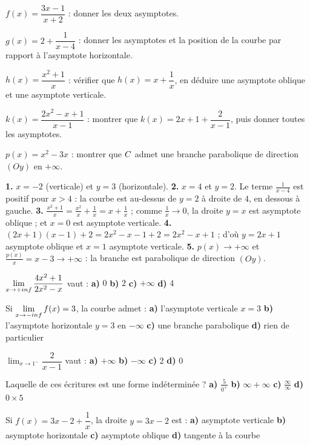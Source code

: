 \begin{entrainement}[asymptotes]
\exo[\niveau{1}] $f(x) = \dfrac{3x-1}{x+2}$ : donner les deux asymptotes.

\exo[\niveau{2}] $g(x) = 2+\dfrac{1}{x-4}$ : donner les asymptotes et la
position de la courbe par rapport à l'asymptote horizontale.

\exo[\niveau{2}] $h(x) = \dfrac{x^{2}+1}{x}$ : vérifier que
$h(x) = x+\dfrac1x$, en déduire une asymptote oblique et une asymptote
verticale.

\exo[\niveau{3}] $k(x) = \dfrac{2x^{2}-x+1}{x-1}$ : montrer que
$k(x) = 2x+1+\dfrac{2}{x-1}$, puis donner toutes les asymptotes.

\exo[\niveau{3}] $p(x) = x^{2}-3x$ : montrer que $C$ admet une branche
parabolique de direction $(Oy)$ en $+\infty$.
\end{entrainement}

\begin{corrige}[asymptotes]
\textbf{1.} $x = -2$ (verticale) et $y = 3$ (horizontale).
\textbf{2.} $x = 4$ et $y = 2$. Le terme $\frac{1}{x-4}$ est positif pour
$x>4$ : la courbe est au-dessus de $y = 2$ à droite de $4$, en dessous à
gauche.
\textbf{3.} $\frac{x^{2}+1}{x} = \frac{x^{2}}{x}+\frac1x = x+\frac1x$ ;
comme $\frac1x \to 0$, la droite $y = x$ est asymptote oblique ; et $x = 0$
est asymptote verticale.
\textbf{4.} $(2x+1)(x-1)+2 = 2x^{2}-x-1+2 = 2x^{2}-x+1$ \checkmark ; d'où
$y = 2x+1$ asymptote oblique et $x = 1$ asymptote verticale.
\textbf{5.} $p(x) \to +\infty$ et $\frac{p(x)}{x} = x-3 \to +\infty$ : la
branche est parabolique de direction $(Oy)$.
\end{corrige}

\begin{qcm}
\exo $\limpinf \dfrac{4x^{2}+1}{2x^{2}-x}$ vaut :
\textbf{a)} $0$ \quad \textbf{b)} $2$ \quad \textbf{c)} $+\infty$ \quad
\textbf{d)} $4$ 

\exo Si $\limminf f(x) = 3$, la courbe admet :
\textbf{a)} l'asymptote verticale $x = 3$ \quad
\textbf{b)} l'asymptote horizontale $y = 3$ en $-\infty$ \quad
\textbf{c)} une branche parabolique \quad \textbf{d)} rien de particulier

\exo $\displaystyle\lim_{x \to 1^{-}} \dfrac{2}{x-1}$ vaut :
\textbf{a)} $+\infty$ \quad \textbf{b)} $-\infty$ \quad \textbf{c)} $2$
\quad \textbf{d)} $0$ 

\exo Laquelle de ces écritures est une forme indéterminée ?
\textbf{a)} $\frac{5}{0^{+}}$ \quad \textbf{b)} $\infty+\infty$ \quad
\textbf{c)} $\frac{\infty}{\infty}$ \quad \textbf{d)} $0\times5$

\exo Si $f(x) = 3x-2+\dfrac{1}{x}$, la droite $y = 3x-2$ est :
\textbf{a)} asymptote verticale \quad \textbf{b)} asymptote horizontale
\quad \textbf{c)} asymptote oblique \quad \textbf{d)} tangente à la courbe
\end{qcm}

